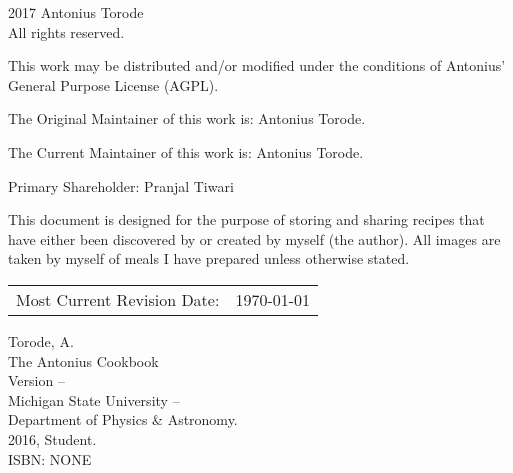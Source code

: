 \pagestyle{empty}
\AddToShipoutPicture*{\TowerGarden}
\begingroup
\footnotesize
\parindent 0pt
\parskip \baselineskip
\textcopyright{} 2017 Antonius Torode \\
All rights reserved.

This work may be distributed and/or modified under the conditions of Antonius’ General Purpose License (AGPL).

The Original Maintainer of this work is: Antonius Torode.

The Current Maintainer of this work is: Antonius Torode.

Primary Shareholder: Pranjal Tiwari

This document is designed for the purpose of storing and sharing recipes that have either been discovered by or created by myself (the author). All images are taken by myself of meals I have prepared unless otherwise stated.

\begin{center}
\begin{tabular}{ll}
Most Current Revision Date: &  \today 
\end{tabular}
\end{center}

\vfill


Torode, A.\\
\hspace*{2em} The Antonius Cookbook \\
\hspace*{2em} Version -- \Version \\
\hspace*{2em} Michigan State University -- \\
\hspace*{2em} Department of Physics \& Astronomy. \\
\hspace*{2em} 2016, Student. \\
\hspace*{2em} ISBN: NONE \\



\endgroup
\clearpage